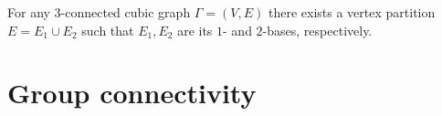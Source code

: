 \begin{lemma} \cite[p. 134]{seymour}
	For any $3$-connected cubic graph $\Gamma=(V,E)$ there exists a vertex partition $E=E_1\cup E_2$ such that $E_1,E_2$ are its $1$- and $2$-bases, respectively.
\end{lemma}

\section{Group connectivity}




